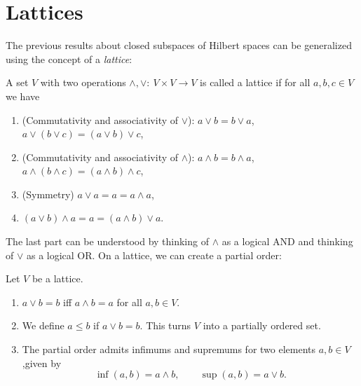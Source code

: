 \documentclass[twoside,symmetric, openany, 12pt]{./tuftebook}
\theoremstyle{definition}
\theoremstyle{definition}
\theoremstyle{definition}
\newenvironment{parts}{\begin{enumerate}[label=(\alph*)]}{\end{enumerate}}
\begin{document}
\section{Lattices}
The previous results about closed subspaces of Hilbert spaces can be generalized using the concept of a \emph{lattice}:
\begin{Definition}[Lattice]
	A set $V$ with two operations $\wedge, \vee:~V\times V \to V$ is called a lattice if for all $a,b,c\in V$ we have
	\begin{parts}
	\item (Commutativity and associativity of $\vee$): $a\vee b = b \vee a$, $a\vee (b \vee c)= (a \vee b)\vee c$, 
	\item (Commutativity and associativity of $\wedge$): $a\wedge b = b \wedge a$, $a\wedge (b\wedge c)=(a\wedge b)\wedge c$,
	\item (Symmetry) $a\vee a = a = a \wedge a$,
	\item $(a\vee b )\wedge a=a=(a\wedge b)\vee a$.
	\end{parts}
\end{Definition}
The last part can be understood by thinking of $\wedge$ as a logical AND and thinking of $\vee$ as a logical OR. On a lattice, we can create a partial order:
\begin{Lemma}
	Let $V$ be a lattice.
	\begin{parts}
	\item $a\vee b = b$ iff $a\wedge b  = a$ for all $a,b\in V$.
	\item We define $a\le b$ if $a\vee b = b$. This turns $V$ into a partially ordered set.
	\item The partial order admits infimums and supremums for two elements $a,b\in V$,given by
		\[
		\inf(a,b)=a\wedge b,\qquad \sup(a,b)=a\vee b
		.\] 
	\end{parts}
\end{Lemma}
\end{document}
